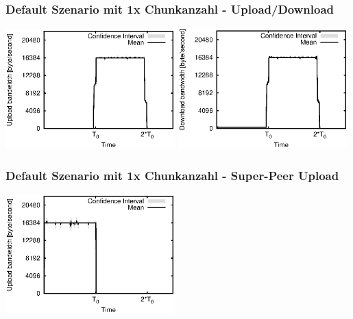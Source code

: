 \begin{frame}
  \frametitle{Default Szenario mit 1x Chunkanzahl - Upload/Download}
  \begin{center}
    \includegraphics[width=0.49\textwidth]{fig/plots/scenario_7_chunk_count_fac_1/plots/GeneratedMeanCurrentUploadBandwidth.csv.eps}
    \includegraphics[width=0.49\textwidth]{fig/plots/scenario_7_chunk_count_fac_1/plots/GeneratedMeanCurrentDownloadBandwidth.csv.eps}
  \end{center}
\end{frame}


\begin{frame}
  \frametitle{Default Szenario mit 1x Chunkanzahl - Super-Peer Upload}
  \begin{center}
    \includegraphics[width=0.49\textwidth]{fig/plots/scenario_7_chunk_count_fac_1/plots/GeneratedMeanCurrentSuperSeederUploadBandwidth.csv.eps}
  \end{center}
\end{frame}


